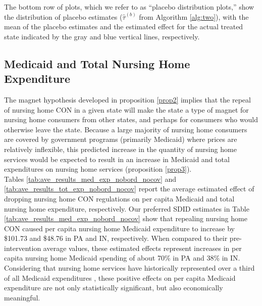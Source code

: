 \documentclass[../Main.tex]{subfiles}
\begin{document}
The bottom row of plots, which we refer to as ``placebo distribution plots,'' show the distribution of placebo estimates ($\hat{\tau}^{(b)}$ from Algorithm \ref{alg:two}), with the mean of the placebo estimates and the estimated effect for the actual treated state indicated by the gray and blue vertical lines, respectively.

\subsection{Medicaid and Total Nursing Home Expenditure}

The magnet hypothesis developed in proposition \ref{prop2} implies that the repeal of nursing home CON in a given state will make the state a type of magnet for nursing home consumers from other states, and perhaps for consumers who would otherwise leave the state. Because a large majority of nursing home consumers are covered by government programs (primarily Medicaid) where prices are relatively inflexible, this predicted increase in the quantity of nursing home services would be expected to result in an increase in Medicaid and total expenditures on nursing home services (proposition \ref{prop3}).\\ 
\indent Tables \ref{tab:ave_results_med_exp_nobord_nocov} and \ref{tab:ave_results_tot_exp_nobord_nocov} report the average estimated effect of dropping nursing home CON regulations on per capita Medicaid and total nursing home expenditure, respectively. Our preferred SDID estimates in Table \ref{tab:ave_results_med_exp_nobord_nocov} show that repealing nursing home CON caused per capita nursing home Medicaid expenditure to increase by \$101.73 and \$48.76 in PA and IN, respectively. When compared to their pre-intervention average values, these estimated effects represent increases in per capita nursing home Medicaid spending of about 70\% in PA and 38\% in IN. Considering that nursing home services have historically represented over a third of all Medicaid expenditures \citep{wiener1999controlling}, these positive effects on per capita Medicaid expenditure are not only statistically significant, but also economically meaningful. 
\end{document}
